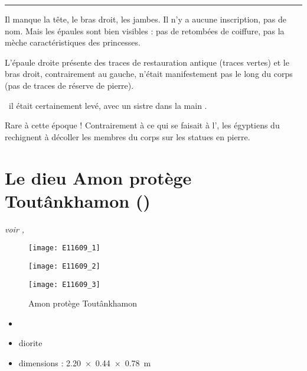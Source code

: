 \documentclass[dvipsnames,a4paper,twoside,10pt,openany,article]{memoir}
\newcommand{\separation}{%
  {\noi\hspace*{\fill}\rule{.33\textwidth}{1pt}\hspace*{\fill}}%
}
\begin{document}
\separation

Il manque la tête, le bras droit, les jambes. Il n'y a aucune 
inscription, pas de nom.
Mais les épaules sont bien visibles : pas de retombées de coiffure, 
pas la mèche caractéristiques des princesses.

L'épaule droite présente des traces de restauration antique 
(traces vertes) et le bras droit, contrairement au gauche, n'était 
manifestement pas le long du corps (pas de traces de réserve de pierre).

\quad\donc~il était certainement levé, avec un sistre dans la 
main .

Rare à cette époque ! Contrairement à ce qui se faisait à l'\OK, les 
égyptiens du \NK rechignent à décoller les membres du corps sur les 
statues en pierre.


\chapter{Le dieu Amon protège Toutânkhamon ()}
\label{sec:E11609}

\puceb{} \emph{voir , }
\bigskip

\begin{figure}[!h]
  \noi\begin{minipage}[m]{0.33\textwidth}
    \centerfloat
    \texttt{[image: E11609\_1]}
  \end{minipage}%
  \hspace{\fill}%
  \begin{minipage}[m]{0.33\textwidth}
    \centerfloat
    \texttt{[image: E11609\_2]}
  \end{minipage}%
  \hspace{\fill}%
  \begin{minipage}[m]{0.33\textwidth}
    \centerfloat
    \texttt{[image: E11609\_3]}
  \end{minipage}
  \caption{Amon protège Toutânkhamon }
  \label{fig:E11609}
\end{figure}

\begin{itemize}
  \item {}
  \item diorite
  \item dimensions : \SI{2.20x0.44x0.78}{\m}
\end{itemize}
\end{document}
